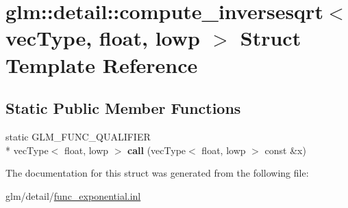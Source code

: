 \hypertarget{structglm_1_1detail_1_1compute__inversesqrt_3_01vecType_00_01float_00_01lowp_01_4}{\section{glm\-:\-:detail\-:\-:compute\-\_\-inversesqrt$<$ vec\-Type, float, lowp $>$ Struct Template Reference}
\label{structglm_1_1detail_1_1compute__inversesqrt_3_01vecType_00_01float_00_01lowp_01_4}
}
\subsection*{Static Public Member Functions}
\begin{DoxyCompactItemize}
\item 
\hypertarget{structglm_1_1detail_1_1compute__inversesqrt_3_01vecType_00_01float_00_01lowp_01_4_a943fd9690f6c1fcb7383bfbcde30c3fb}{static G\-L\-M\-\_\-\-F\-U\-N\-C\-\_\-\-Q\-U\-A\-L\-I\-F\-I\-E\-R \\*
vec\-Type$<$ float, lowp $>$ {\bfseries call} (vec\-Type$<$ float, lowp $>$ const \&x)}\label{structglm_1_1detail_1_1compute__inversesqrt_3_01vecType_00_01float_00_01lowp_01_4_a943fd9690f6c1fcb7383bfbcde30c3fb}

\end{DoxyCompactItemize}


The documentation for this struct was generated from the following file\-:\begin{DoxyCompactItemize}
\item 
glm/detail/\hyperlink{func__exponential_8inl}{func\-\_\-exponential.\-inl}\end{DoxyCompactItemize}
